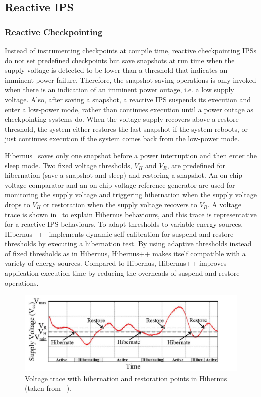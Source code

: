 \subsection{Reactive IPS} \label{Section:reactiveic}

\subsubsection{Reactive Checkpointing} 

Instead of instrumenting checkpoints at compile time, reactive checkpointing IPSs do not set predefined checkpoints but save snapshots at run time when the supply voltage is detected to be lower than a threshold that indicates an imminent power failure. 
Therefore, the snapshot saving operations is only invoked when there is an indication of an imminent power outage, i.e. a low supply voltage. 
Also, after saving a snapshot, a reactive IPS suspends its execution and enter a low-power mode, rather than continues execution until a power outage as checkpointing systems do. 
When the voltage supply recovers above a restore threshold, the system either restores the last snapshot if the system reboots, or just continues execution if the system comes back from the low-power mode.

Hibernus~\cite{balsamo2015hibernus} saves only one snapshot before a power interruption and then enter the sleep mode. 
Two fixed voltage thresholds, $V_H$ and $V_R$, are predefined for hibernation (save a snapshot and sleep) and restoring a snapshot. 
An on-chip voltage comparator and an on-chip voltage reference generator are used for monitoring the supply voltage and triggering hibernation when the supply voltage drops to $V_H$ or restoration when the supply voltage recovers to $V_R$. 
A voltage trace is shown in~ to explain Hibernus behaviours, and this trace is representative for a reactive IPS behaviours. 
To adapt thresholds to variable energy sources, Hibernus++~\cite{balsamo2016hibernus++} implements dynamic self-calibration for suspend and restore thresholds by executing a hibernation test. 
By using adaptive thresholds instead of fixed thresholds as in Hibernus, Hibernus++ makes itself compatible with a variety of energy sources. 
Compared to Hibernus, Hibernus++ improves application execution time by reducing the overheads of suspend and restore operations.

\begin{figure}
    \centering
    \includegraphics[width=\columnwidth]{ch2_review/figures/hibernus}
    \caption{Voltage trace with hibernation and restoration points in Hibernus (taken from \cite{balsamo2015hibernus}~).}
    \label{Figure:hibernus}
\end{figure}

